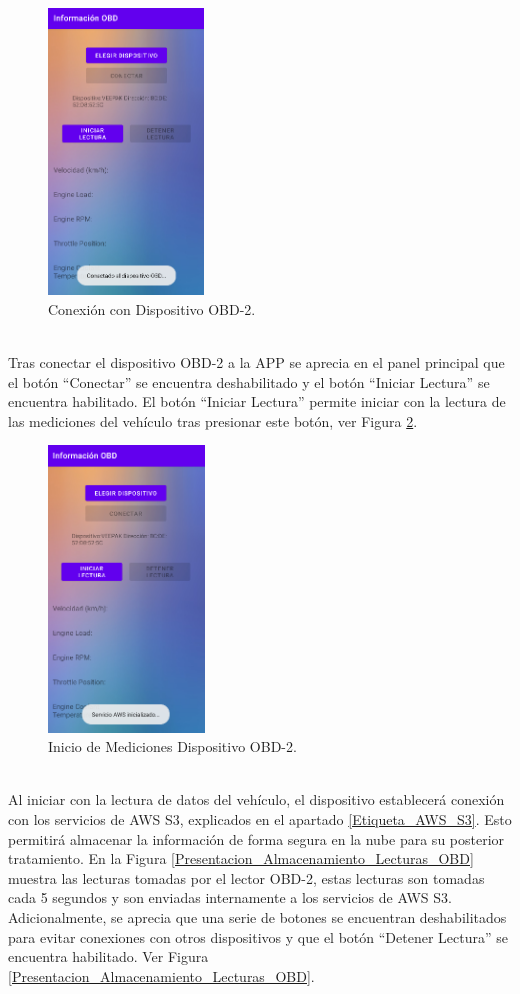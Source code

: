 \documentclass[a4paper,10pt, oneside, titlepage]{article}
\begin{document}
	\begin{figure}[!h]
		\centering
		\includegraphics[width = 0.45\linewidth, height = 7.6cm]{Conectar_OBD-2.png}
		\caption{Conexión con Dispositivo OBD-2.}
		\label{Conectar_OBD-2}
	\end{figure} \\
	\indent Tras conectar el dispositivo OBD-2 a la APP se aprecia en el panel principal que el botón ``Conectar'' se encuentra deshabilitado y el botón ``Iniciar Lectura'' se encuentra habilitado. El botón ``Iniciar Lectura'' permite iniciar con la lectura de las mediciones del vehículo tras presionar este botón, ver Figura \ref{Inicio_Mediciones_OBD-2}.
	\begin{figure}[!h]
		\centering
		\includegraphics[width = 0.45\linewidth, height = 7.6cm]{Inicio_Mediciones_OBD-2.png}
		\caption{Inicio de Mediciones Dispositivo OBD-2.}
		\label{Inicio_Mediciones_OBD-2}
	\end{figure} \\
	\indent Al iniciar con la lectura de datos del vehículo, el dispositivo establecerá conexión con los servicios de AWS S3, explicados en el apartado \ref{Etiqueta_AWS_S3}. Esto permitirá almacenar la información de forma segura en la nube para su posterior tratamiento. En la Figura \ref{Presentacion_Almacenamiento_Lecturas_OBD} muestra las lecturas tomadas por el lector OBD-2, estas lecturas son tomadas cada 5 segundos y son enviadas internamente a los servicios de AWS S3. Adicionalmente, se aprecia que una serie de botones se encuentran deshabilitados para evitar conexiones con otros dispositivos y que el botón ``Detener Lectura'' se encuentra habilitado. Ver Figura \ref{Presentacion_Almacenamiento_Lecturas_OBD}.
\end{document}
